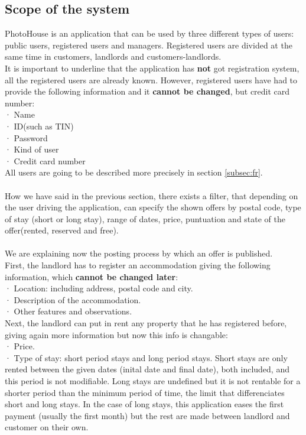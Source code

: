 \documentclass[12pt]{article}
\begin{document}
\subsection{Scope of the system}
PhotoHouse is an application that can be used by three different types of users: public users, registered users and managers. Registered users are divided at the same time in customers, landlords and customers-landlords.\\It is important to underline that the application has \textbf{not} got registration system, all the registered users are already known. However, registered users have had to provide the following information and it \textbf{cannot be changed}, but credit card number:\\
· Name\\· ID(such as TIN)\\· Password\\· Kind of user\\· Credit card number\\All users are going to be described more precisely in section \ref{subsec:fr}.\\\\
How we have said in the previous section, there exists a filter, that depending on the user driving the application, can specify the shown offers by postal code, type of stay (short or long stay), range of dates, price, puntuation and state of the offer(rented, reserved and free).\\\\
We are explaining now the posting process by which an offer is published.\\First, the landlord has to register an accommodation giving the following information, which \textbf{cannot be changed later}:\\
· Location: including address, postal code and city.\\
· Description of the accommodation.\\
· Other features and observations.\\
Next, the landlord can put in rent any property that he has registered before, giving again more information but now this info is changable:\\
· Price.\\
· Type of stay: short period stays and long period stays. Short stays are only rented between the given dates (inital date and final date), both included, and this period is not modifiable. Long stays are undefined but it is not rentable for a shorter period than the minimum period of time, the limit that differenciates short and long stays. In the case of long stays, this application eases the first payment (usually the first month) but the rest are made between landlord and customer on their own.\\
\end{document}
